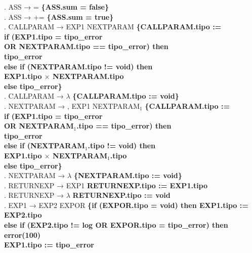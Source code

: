 \begin{tabbing}
    . ASS → = \textbf{\{ASS.sum = false\}}\\
    . ASS → += \textbf{\{ASS.sum = true\}}\\
    . CALLPARAM → EXP1 NEXTPARAM \textbf{\{CALLPARAM.tipo :=}\\
    \>                    \> \textbf{if (EXP1.tipo = tipo\_error}\\
    \>                    \> \textbf{OR NEXTPARAM.tipo == tipo\_error) then}\\
    \>                    \> \> \textbf{tipo\_error}\\
    \>                    \> \textbf{else if (NEXTPARAM.tipo != void) then}\\
    \>                    \> \>\textbf{EXP1.tipo $\times$ NEXTPARAM.tipo}\\
    \>                    \> \textbf{else tipo\_error\}}\\ 
    . CALLPARAM → $\lambda$ \textbf{\{CALLPARAM.tipo := void\}}\\
    . NEXTPARAM → , EXP1 NEXTPARAM$_1$ \textbf{\{CALLPARAM.tipo :=}\\
    \>                    \> \textbf{if (EXP1.tipo = tipo\_error}\\
    \>                    \> \textbf{OR NEXTPARAM$_1$.tipo == tipo\_error) then}\\
    \>                    \> \> \textbf{tipo\_error}\\
    \>                    \> \textbf{else if (NEXTPARAM$_1$.tipo != void) then}\\
    \>                    \> \>\textbf{EXP1.tipo $\times$ NEXTPARAM$_1$.tipo}\\
    \>                    \> \textbf{else tipo\_error\}}\\ 
    . NEXTPARAM → $\lambda$ \textbf{\{NEXTPARAM.tipo := void\}}\\
    . RETURNEXP → EXP1 \textbf{RETURNEXP.tipo := EXP1.tipo}\\
    . RETURNEXP → $\lambda$ \textbf{RETURNEXP.tipo := void}\\
    . EXP1 → EXP2 EXPOR \>\textbf{\{if (EXPOR.tipo = void) then EXP1.tipo := EXP2.tipo}\\
    \>                     \> \textbf{else if (EXP2.tipo != log OR EXPOR.tipo = tipo\_error) then}\\
    \>                     \> \> \textbf{error(100)}\\
    \>                     \> \> \textbf{EXP1.tipo := tipo\_error}\\

\end{tabbing}

